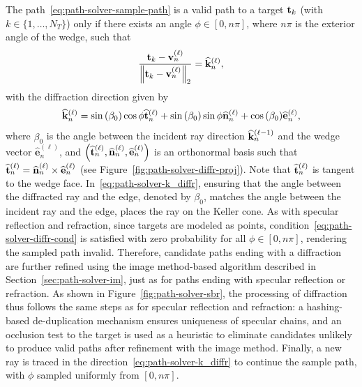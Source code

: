 The path~\eqref{eq:path-solver-sample-path} is a valid path to a target $\mathbf{t}_k$ (with $k \in \{1, \dots, N_T\}$) only if there exists an angle $\phi \in [0, n\pi]$, where $n\pi$ is the exterior angle of the wedge, such that
\begin{equation}
    \label{eq:path-solver-diffr-cond}
    \frac{\mathbf{t}_k - \mathbf{v}_n^{(\ell)}}{\left\lVert\mathbf{t}_k - \mathbf{v}_n^{(\ell)}\right\rVert_2} = \widehat{\mathbf{k}}_n^{(\ell)},
\end{equation}
with the diffraction direction given by
\begin{equation}
    \label{eq:path-solver-k_diffr}
    \widehat{\mathbf{k}}_n^{(\ell)} = \sin{\left(\beta_0\right)}\cos{\phi} \widehat{\mathbf{t}}_n^{(\ell)}
                               + \sin{\left(\beta_0\right)}\sin{\phi} \widehat{\mathbf{n}}_n^{(\ell)}
                               + \cos{\left(\beta_0\right)} \widehat{\mathbf{e}}_n^{(\ell)},
\end{equation}
where $\beta_0$ is the angle between the incident ray direction $\widehat{\mathbf{k}}_n^{(\ell-1)}$ and the wedge vector $\widehat{\mathbf{e}}_n^{(\ell)}$, and $\left(\widehat{\mathbf{t}}_n^{(\ell)}, \widehat{\mathbf{n}}_n^{(\ell)}, \widehat{\mathbf{e}}_n^{(\ell)}\right)$ is an orthonormal basis such that $\widehat{\mathbf{t}}_n^{(\ell)} = \widehat{\mathbf{n}}_n^{(\ell)} \times \widehat{\mathbf{e}}_n^{(\ell)}$ (see Figure~\ref{fig:path-solver-diffr-proj}).
Note that $\widehat{\mathbf{t}}_n^{(\ell)}$ is tangent to the wedge face.
In~\eqref{eq:path-solver-k_diffr}, ensuring that the angle between the diffracted ray and the edge, denoted by $\beta_0$, matches the angle between the incident ray and the edge, places the ray on the Keller cone.
As with specular reflection and refraction, since targets are modeled as points, condition~\eqref{eq:path-solver-diffr-cond} is satisfied with zero probability for all $\phi \in [0, n\pi]$, rendering the sampled path invalid.
Therefore, candidate paths ending with a diffraction are further refined using the image method-based algorithm described in Section~\ref{sec:path-solver-im}, just as for paths ending with specular reflection or refraction.
As shown in Figure~\ref{fig:path-solver-sbr}, the processing of diffraction thus follows the same steps as for specular reflection and refraction: a hashing-based de-duplication mechanism ensures uniqueness of specular chains, and an occlusion test to the target is used as a heuristic to eliminate candidates unlikely to produce valid paths after refinement with the image method.
Finally, a new ray is traced in the direction~\eqref{eq:path-solver-k_diffr} to continue the sample path, with $\phi$ sampled uniformly from $[0, n\pi]$.

